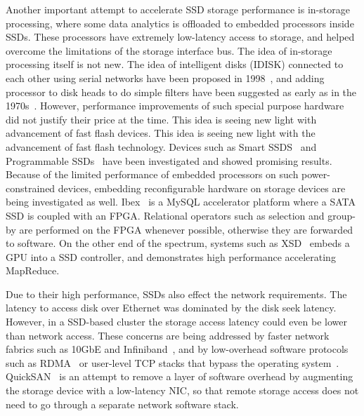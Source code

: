 Another important attempt to accelerate SSD storage performance is in-storage
processing, where some data analytics is offloaded to embedded processors inside
SSDs. These processors have extremely low-latency access to storage, and helped
overcome the limitations of the storage interface bus. The idea of in-storage
processing itself is not new. The idea of intelligent disks (IDISK) connected to
each other using serial networks have been proposed in 1998~\cite{idisk}, and
adding processor to disk heads to do simple filters have been suggested as early
as in the 1970s~\cite{?,?,?}. However, performance improvements of such special
purpose hardware did not justify their price at the time. This idea is seeing
new light with advancement of fast flash devices. This idea is seeing new light
with the advancement of fast flash technology. Devices such as Smart
SSDS~\cite{smartssdquery,smartssdcost,ucsd_willow} and Programmable
SSDs~\cite{xsd} have been investigated and showed promising results. Because of
the limited performance of embedded processors on such power-constrained
devices, embedding reconfigurable hardware on storage devices are being
investigated as well. Ibex~\cite{ibex} is a MySQL accelerator platform where a
SATA SSD is coupled with an FPGA. Relational operators such as selection and
group-by are performed on the FPGA whenever possible, otherwise they are
forwarded to software. On the other end of the spectrum, systems such as
XSD~\cite{xsd} embeds a GPU into a SSD controller, and demonstrates high
performance accelerating MapReduce.

Due to their high performance, SSDs also effect the network requirements.  The
latency to access disk over Ethernet was dominated by the disk seek latency.
However, in a SSD-based cluster the storage access latency could even be lower
than network access. These concerns are being addressed by faster network
fabrics such as 10GbE and Infiniband~\cite{infiniband}, and by low-overhead
software protocols such as RDMA~\cite{rdmampi, rdmahdfs, homrmapreduce, rdmahpc,
rdmampi, hadoopinfiniband} or user-level TCP stacks that bypass the operating
system~\cite{usertcp,userlevelprotocol}. QuickSAN~\cite{ucsd_quicksan} is an
attempt to remove a layer of software overhead by augmenting the storage device
with a low-latency NIC, so that remote storage access does not need to go
through a separate network software stack.


